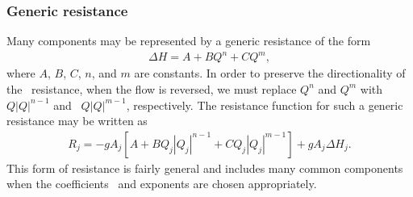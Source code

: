 \subsubsection{Generic resistance}

Many components may be represented by a generic resistance of the form
\begin{align}
    \Delta H = A + B Q^n + C Q^m,
\end{align}
where $A$, $B$, $C$, $n$, and $m$ are constants. In order to preserve the directionality of the \ 
resistance, when the flow is reversed, we must replace $Q^n$ and $Q^m$ with $Q|Q|^{n-1}$ and \ 
$Q|Q|^{m-1}$, respectively. The resistance function for such a generic resistance may be written as
\begin{align} \label{generic_resistance}
    \boxed{ R_j = - g A_j \left[A + B Q_j|Q_j|^{n-1} + C Q_j|Q_j|^{m-1} \right] +  g A_j \Delta H_j. }
\end{align}
This form of resistance is fairly general and includes many common components when the coefficients \ 
and exponents are chosen appropriately. 


